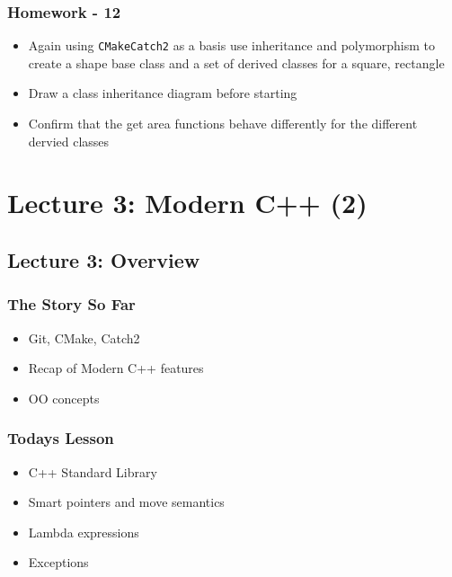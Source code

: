 \subsubsection{Homework - 12}\label{homework---12}

\begin{itemize}
\itemsep1pt\parskip0pt
\item
  Again using \texttt{CMakeCatch2} as a basis use inheritance and
  polymorphism to create a shape base class and a set of derived classes
  for a square, rectangle
\item
  Draw a class inheritance diagram before starting
\item
  Confirm that the get area functions behave differently for the
  different dervied classes
\end{itemize}

\section{Lecture 3: Modern C++ (2)}\label{lecture-3-modern-c-2}

\subsection{Lecture 3: Overview}\label{lecture-3-overview}

\subsubsection{The Story So Far}\label{the-story-so-far-1}

\begin{itemize}
\itemsep1pt\parskip0pt
\item
  Git, CMake, Catch2
\item
  Recap of Modern C++ features
\item
  OO concepts
\end{itemize}

\subsubsection{Todays Lesson}\label{todays-lesson-1}

\begin{itemize}
\itemsep1pt\parskip0pt
\item
  C++ Standard Library
\item
  Smart pointers and move semantics
\item
  Lambda expressions
\item
  Exceptions
\end{itemize}

